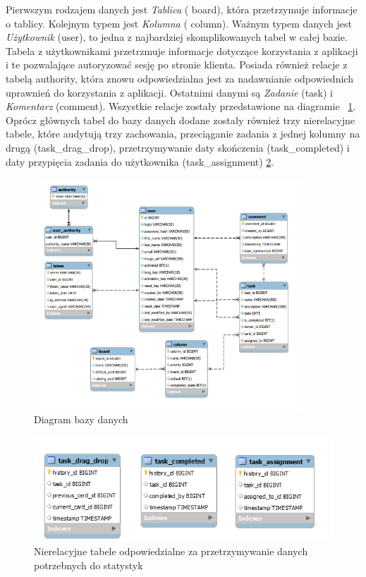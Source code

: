 Pierwszym rodzajem danych jest \textit{Tablica} ( board), która przetrzymuje informacje o tablicy. Kolejnym typem jest  \textit{Kolumna} ( column). Ważnym typem danych jest  \textit{Użytkownik}  (user), to jedna z najbardziej skomplikowanych tabel w całej bazie. Tabela z użytkownikami przetrzmuje informacje dotyczące korzystania z aplikacji i te  pozwalające autoryzować sesję po stronie klienta. Posiada również relacje z tabelą authority, która znowu odpowiedzialna jest za nadawnianie odpowiednich uprawnień do korzystania z aplikacji. Ostatnimi  danymi są \textit{Zadanie} (task) i \textit{Komentarz} (comment). Wszystkie relacje zostały przedstawione na diagramie ~\ref{projektdb}.
Oprócz głównych tabel do bazy danych dodane zostały również trzy nierelacyjne tabele, które audytują trzy zachowania, przeciąganie zadania z jednej kolumny na drugą (task\_drag\_drop), przetrzymywanie daty skończenia (task\_completed) i daty przypięcia zadania do użytkownika (task\_assignment) \ref{nierel}.

\begin{figure}[h]
	\centering
	\includegraphics[width=0.90\textwidth]{diagram-bazy}

	\caption{ Diagram bazy danych}
		\label{projektdb}
\end{figure}


\begin{figure}[h]
	\centering
	\includegraphics[]{nierelacyjne}

	\caption{ Nierelacyjne tabele odpowiedzialne za przetrzymywanie danych potrzebnych do statystyk }
	\label{nierel}
\end{figure}
\clearpage
